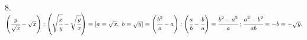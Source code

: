 8. $\left(\cfrac{y}{\sqrt{x}}-\sqrt{x}\right):\left(\sqrt{\cfrac{x}{y}}-\sqrt{\cfrac{y}{x}}\right)=[a=\sqrt{x},\ b=\sqrt{y}]=
\left(\cfrac{b^2}{a}-a\right):\left(\cfrac{a}{b}-\cfrac{b}{a}\right)=
\cfrac{b^2-a^2}{a}:\cfrac{a^2-b^2}{ab}=-b=-\sqrt{y}.$\\
